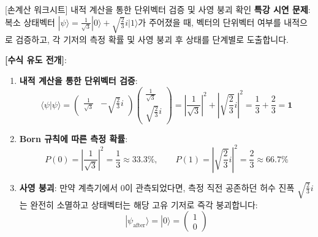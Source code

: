 \documentclass[11pt, a4paper]{article}
\newcommand{\ket}[1]{|#1\rangle}
\newcommand{\braket}[2]{\langle#1|#2\rangle}
\theoremstyle{definition}
\begin{document}
\begin{worksheetbox}{[손계산 워크시트] 내적 계산을 통한 단위벡터 검증 및 사영 붕괴 확인}
\textbf{특강 시연 문제}: 복소 상태벡터 $\ket{\psi} = \frac{1}{\sqrt{3}}\ket{0} + \sqrt{\frac{2}{3}}i\ket{1}$가 주어졌을 때, 벡터의 단위벡터 여부를 내적으로 검증하고, 각 기저의 측정 확률 및 사영 붕괴 후 상태를 단계별로 도출합니다.

\textbf{[수식 유도 전개]}:
\begin{enumerate}
    \item \textbf{내적 계산을 통한 단위벡터 검증}:
    $$\braket{\psi}{\psi} = \begin{pmatrix} \frac{1}{\sqrt{3}} & -\sqrt{\frac{2}{3}}i \end{pmatrix}\begin{pmatrix} \frac{1}{\sqrt{3}} \\ \sqrt{\frac{2}{3}}i \end{pmatrix} = \left|\frac{1}{\sqrt{3}}\right|^2 + \left|\sqrt{\frac{2}{3}}i\right|^2 = \frac{1}{3} + \frac{2}{3} = \mathbf{1}$$
    \item \textbf{Born 규칙에 따른 측정 확률}:
    $$P(0) = \left|\frac{1}{\sqrt{3}}\right|^2 = \frac{1}{3} \approx \mathbf{33.3\%}, \qquad P(1) = \left|\sqrt{\frac{2}{3}}i\right|^2 = \frac{2}{3} \approx \mathbf{66.7\%}$$
    \item \textbf{사영 붕괴}: 만약 계측기에서 $0$이 관측되었다면, 측정 직전 공존하던 허수 진폭 $\sqrt{\frac{2}{3}}i$는 완전히 소멸하고 상태벡터는 해당 고유 기저로 즉각 붕괴합니다:
    $$\ket{\psi_{\mathrm{after}}} = \ket{0} = \begin{pmatrix} 1 \\ 0 \end{pmatrix}$$
\end{enumerate}
\end{worksheetbox}
\end{document}

